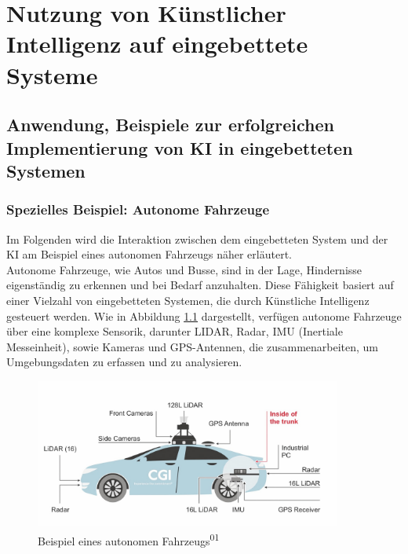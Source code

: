\chapter {Nutzung von Künstlicher Intelligenz auf eingebettete Systeme
}

\section{Anwendung, Beispiele zur erfolgreichen Implementierung von KI in eingebetteten 
Systemen}
\subsection{Spezielles Beispiel: Autonome Fahrzeuge}
Im Folgenden wird die Interaktion zwischen dem eingebetteten System und der KI am Beispiel eines autonomen Fahrzeugs näher erläutert.\\
Autonome Fahrzeuge, wie Autos und Busse, sind in der Lage, Hindernisse eigenständig zu erkennen und bei Bedarf anzuhalten. Diese Fähigkeit basiert auf einer Vielzahl von eingebetteten Systemen, die durch Künstliche Intelligenz  gesteuert werden. Wie in Abbildung \ref{fig:Kommu} dargestellt, verfügen autonome Fahrzeuge über eine komplexe Sensorik, darunter LIDAR, Radar, IMU (Inertiale Messeinheit), sowie Kameras und GPS-Antennen, die zusammenarbeiten, um Umgebungsdaten zu erfassen und zu analysieren.
\begin{figure}[h]
	\centering
	\includegraphics[width=0.9\textwidth]{img/Fahzeuge_GCI.jpg}
	\caption{Beispiel eines autonomen Fahrzeugs\textsuperscript{01}}
	\label{fig:Kommu}
\end{figure}

